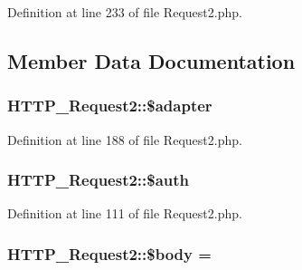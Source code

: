 Definition at line 233 of file Request2.\+php.



\subsection{Member Data Documentation}
\subsubsection[{\texorpdfstring{\$adapter}{$adapter}}]{\setlength{\rightskip}{0pt plus 5cm}H\+T\+T\+P\+\_\+\+Request2\+::\$adapter\hspace{0.3cm}{\ttfamily [protected]}}\hypertarget{classHTTP__Request2_a4de3f606051b53b314179271f9bd0173}{}\label{classHTTP__Request2_a4de3f606051b53b314179271f9bd0173}


Definition at line 188 of file Request2.\+php.

\subsubsection[{\texorpdfstring{\$auth}{$auth}}]{\setlength{\rightskip}{0pt plus 5cm}H\+T\+T\+P\+\_\+\+Request2\+::\$auth\hspace{0.3cm}{\ttfamily [protected]}}\hypertarget{classHTTP__Request2_a4c1219356a8c669730a1fe09bd8f81b1}{}\label{classHTTP__Request2_a4c1219356a8c669730a1fe09bd8f81b1}


Definition at line 111 of file Request2.\+php.

\subsubsection[{\texorpdfstring{\$body}{$body}}]{\setlength{\rightskip}{0pt plus 5cm}H\+T\+T\+P\+\_\+\+Request2\+::\$body = \textquotesingle{}\textquotesingle{}\hspace{0.3cm}{\ttfamily [protected]}}\hypertarget{classHTTP__Request2_af7de92496442c98589954db8327f9faf}{}\label{classHTTP__Request2_af7de92496442c98589954db8327f9faf}


